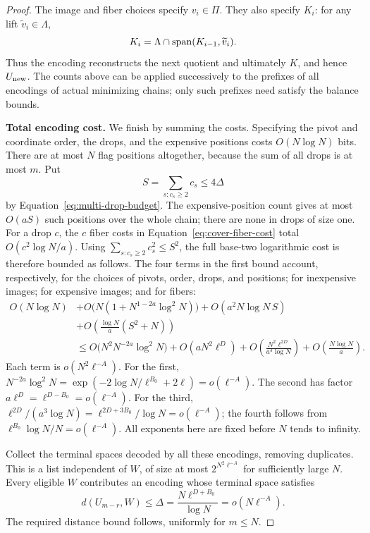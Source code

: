 \begin{proof}
The image and fiber choices specify \(v_i\in\Pi\). They also specify
\(K_i\): for any lift \(\widetilde v_i\in\Lambda\),
\[
 K_i=\Lambda\cap\operatorname{span}(K_{i-1},\widetilde v_i).
\]
Thus the encoding reconstructs the next quotient and ultimately
\(K\), and hence \(U_{\rm new}\). The counts above can be applied
successively to the prefixes of all encodings of actual minimizing
chains; only such prefixes need satisfy the balance bounds.

\medskip\noindent\textbf{Total encoding cost.}
We finish by summing the costs. Specifying the pivot and coordinate
order, the drops, and the expensive positions costs \(O(N\log N)\)
bits. There are at most \(N\) flag positions altogether, because the
sum of all drops is at most \(m\). Put
\[
 S=\sum_{s:c_s\ge2}c_s\le4\Delta
\]
by Equation~\eqref{eq:multi-drop-budget}. The expensive-position
count gives at most \(O(aS)\) such positions over the whole chain;
there are none in drops of size one. For a drop \(c\), the \(c\)
fiber costs in Equation~\eqref{eq:cover-fiber-cost} total
\(O(c^2\log N/a)\). Using
\(\sum_{s:c_s\ge2}c_s^2\le S^2\), the full base-two logarithmic cost is
therefore bounded as follows. The four terms in the first bound account,
respectively, for the choices of pivots, order, drops, and positions;
for inexpensive images; for expensive images; and for fibers:
\[
 \begin{split}
 O(N\log N)
 &+O\bigl(N(1+N^{1-2a}\log^2N)\bigr)
   +O(a^2N\log N\,S)\\
 &+O\left(\frac{\log N}{a}(S^2+N)\right)\\
 &\le
 O\bigl(N^2N^{-2a}\log^2N\bigr)
 +O(aN^2\ell^D)
 +O\left(\frac{N^2\ell^{2D}}{a^3\log N}\right)
 +O\left(\frac{N\log N}{a}\right).
 \end{split}
\]
Each term is \(o(N^2\ell^{-A})\). For the first,
\(N^{-2a}\log^2N=\exp(-2\log N/\ell^{B_0}+2\ell)
=o(\ell^{-A})\). The second has factor
\(a\ell^D=\ell^{D-B_0}=o(\ell^{-A})\). For the third,
\(\ell^{2D}/(a^3\log N)=\ell^{2D+3B_0}/\log N=o(\ell^{-A})\);
the fourth follows from
\(\ell^{B_0}\log N/N=o(\ell^{-A})\). All exponents here are fixed
before \(N\) tends to infinity.

Collect the terminal spaces decoded by all these encodings, removing
duplicates. This is a list independent of \(W\), of size at most
\(2^{N^2\ell^{-A}}\) for sufficiently large \(N\). Every eligible
\(W\) contributes an encoding whose terminal space satisfies
\[
 d(U_{m-r},W)\le\Delta
 =\frac{N\ell^{D+B_0}}{\log N}
 =o(N\ell^{-A}).
\]
The required distance bound follows, uniformly for \(m\le N\).
\end{proof}
